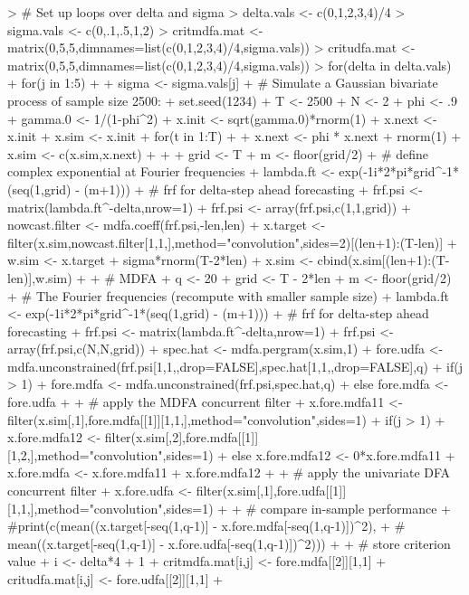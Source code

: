 \documentclass[a4paper]{book}
\begin{document}
\begin{Schunk}
\begin{Sinput}
> # Set up loops over delta and sigma
> delta.vals <- c(0,1,2,3,4)/4
> sigma.vals <- c(0,.1,.5,1,2)
> critmdfa.mat <- matrix(0,5,5,dimnames=list(c(0,1,2,3,4)/4,sigma.vals))
> critudfa.mat <- matrix(0,5,5,dimnames=list(c(0,1,2,3,4)/4,sigma.vals))
> for(delta in delta.vals) {
+ for(j in 1:5) {
+ 
+ sigma <- sigma.vals[j]
+ # Simulate a Gaussian bivariate process of sample size 2500:
+ set.seed(1234)
+ T <- 2500
+ N <- 2
+ phi <- .9
+ gamma.0 <- 1/(1-phi^2)
+ x.init <- sqrt(gamma.0)*rnorm(1)
+ x.next <- x.init
+ x.sim <- x.init
+ for(t in 1:T)
+ {
+ 	x.next <- phi * x.next + rnorm(1)
+ 	x.sim <- c(x.sim,x.next)
+ }
+ 
+ grid <- T
+ m <- floor(grid/2)
+ # define complex exponential at Fourier frequencies
+ lambda.ft <- exp(-1i*2*pi*grid^{-1}*(seq(1,grid) - (m+1)))
+ # frf for delta-step ahead forecasting
+ frf.psi <- matrix(lambda.ft^{-delta},nrow=1) 
+ frf.psi <- array(frf.psi,c(1,1,grid))
+ nowcast.filter <- mdfa.coeff(frf.psi,-len,len)
+ x.target <- filter(x.sim,nowcast.filter[1,1,],method="convolution",sides=2)[(len+1):(T-len)]
+ w.sim <- x.target + sigma*rnorm(T-2*len)
+ x.sim <- cbind(x.sim[(len+1):(T-len)],w.sim)
+ 
+ # MDFA
+ q <- 20
+ grid <- T - 2*len
+ m <- floor(grid/2)
+ # The Fourier frequencies (recompute with smaller sample size)
+ lambda.ft <- exp(-1i*2*pi*grid^{-1}*(seq(1,grid) - (m+1)))
+ # frf for delta-step ahead forecasting
+ frf.psi <- matrix(lambda.ft^{-delta},nrow=1) %
+ frf.psi <- array(frf.psi,c(N,N,grid))
+ spec.hat <- mdfa.pergram(x.sim,1)	
+ fore.udfa <- mdfa.unconstrained(frf.psi[1,1,,drop=FALSE],spec.hat[1,1,,drop=FALSE],q)
+ if(j > 1) { 
+ 	fore.mdfa <- mdfa.unconstrained(frf.psi,spec.hat,q) 
+ } else { fore.mdfa <- fore.udfa }
+   
+ # apply the MDFA concurrent filter
+ x.fore.mdfa11 <- filter(x.sim[,1],fore.mdfa[[1]][1,1,],method="convolution",sides=1)
+ if(j > 1) { 
+ 	x.fore.mdfa12 <- filter(x.sim[,2],fore.mdfa[[1]][1,2,],method="convolution",sides=1) 
+ } else { x.fore.mdfa12 <- 0*x.fore.mdfa11 }
+ x.fore.mdfa <- x.fore.mdfa11 + x.fore.mdfa12 
+ 
+ # apply the univariate DFA concurrent filter
+ x.fore.udfa <- filter(x.sim[,1],fore.udfa[[1]][1,1,],method="convolution",sides=1)
+ 
+ # compare in-sample performance
+ #print(c(mean((x.target[-seq(1,q-1)] - x.fore.mdfa[-seq(1,q-1)])^2),
+ #	mean((x.target[-seq(1,q-1)] - x.fore.udfa[-seq(1,q-1)])^2)))
+ 
+ # store criterion value
+ i <- delta*4 + 1
+ critmdfa.mat[i,j] <- fore.mdfa[[2]][1,1]
+ critudfa.mat[i,j] <- fore.udfa[[2]][1,1]
+ }}
\end{Sinput}
\end{Schunk}
\end{document}
